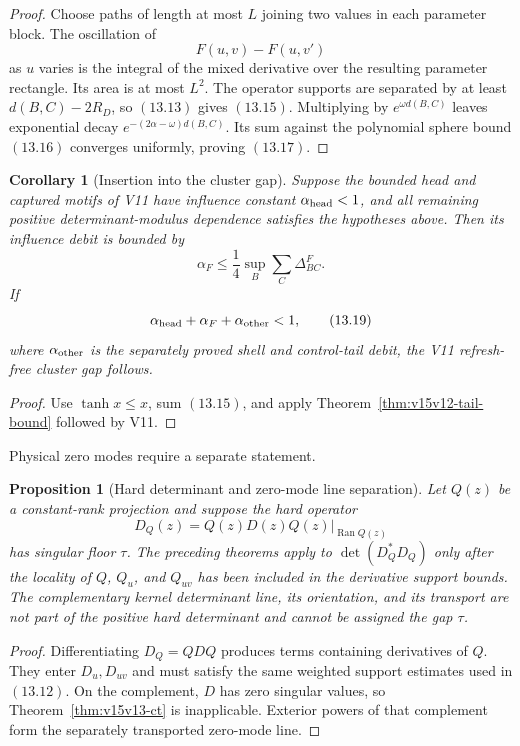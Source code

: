 \documentclass[11pt]{article}
\newtheorem{proposition}[theorem]{Proposition}
\newtheorem{corollary}[theorem]{Corollary}
\theoremstyle{remark}
\begin{document}
\begin{proof}
Choose paths of length at most \(L\) joining two values in each
parameter block.  The oscillation of
\[
 F(u,v)-F(u,v')
\]
as \(u\) varies is the integral of the mixed derivative over the
resulting parameter rectangle.  Its area is at most \(L^2\).
The operator supports are separated by at least
\(d(B,C)-2R_D\), so \((13.13)\) gives \((13.15)\).
Multiplying by \(e^{\omega d(B,C)}\) leaves exponential decay
\(e^{-(2\alpha-\omega)d(B,C)}\).  Its sum against the polynomial
sphere bound \((13.16)\) converges uniformly, proving
\((13.17)\).
\end{proof}

\begin{corollary}[Insertion into the cluster gap]
\label{cor:v15v13-cluster}
Suppose the bounded head and captured motifs of V11 have influence
constant \(\alpha_{\rm head}<1\), and all remaining positive
determinant-modulus dependence satisfies the hypotheses above.
Then its influence debit is bounded by
\[
 \alpha_F
 \le\frac14\sup_B\sum_C\Delta_{BC}^{F}.                      \tag{13.18}
\]
If
\[
 \alpha_{\rm head}+\alpha_F+\alpha_{\rm other}<1,             \tag{13.19}
\]
where \(\alpha_{\rm other}\) is the separately proved shell and
control-tail debit, the V11 refresh-free cluster gap follows.
\end{corollary}

\begin{proof}
Use \(\tanh x\le x\), sum \((13.15)\), and apply
Theorem~\ref{thm:v15v12-tail-bound} followed by V11.
\end{proof}

Physical zero modes require a separate statement.

\begin{proposition}[Hard determinant and zero-mode line separation]
\label{prop:v15v13-zero}
Let \(Q(z)\) be a constant-rank projection and suppose the hard
operator
\[
 D_Q(z)=Q(z)D(z)Q(z)|_{\operatorname{Ran}Q(z)}
\]
has singular floor \(\tau\).  The preceding theorems apply to
\(\det(D_Q^*D_Q)\) only after the locality of \(Q\), \(Q_u\), and
\(Q_{uv}\) has been included in the derivative support bounds.
The complementary kernel determinant line, its orientation, and
its transport are not part of the positive hard determinant and
cannot be assigned the gap \(\tau\).
\end{proposition}

\begin{proof}
Differentiating \(D_Q=QDQ\) produces terms containing derivatives
of \(Q\).  They enter \(D_u,D_{uv}\) and must satisfy the same
weighted support estimates used in \((13.12)\).  On the
complement, \(D\) has zero singular values, so
Theorem~\ref{thm:v15v13-ct} is inapplicable.  Exterior powers of
that complement form the separately transported zero-mode line.
\end{proof}
\end{document}
